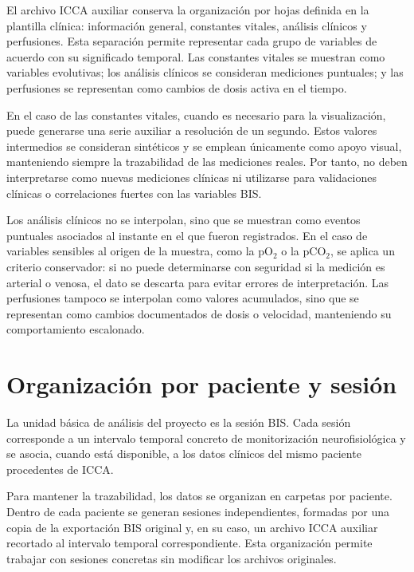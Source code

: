\documentclass[
  spanish,
  a4paper,
  12pt,
  twoside]{memoir}
\begin{document}
El archivo ICCA auxiliar conserva la organización por hojas definida en
la plantilla clínica: información general, constantes vitales, análisis
clínicos y perfusiones. Esta separación permite representar cada grupo
de variables de acuerdo con su significado temporal. Las constantes
vitales se muestran como variables evolutivas; los análisis clínicos se
consideran mediciones puntuales; y las perfusiones se representan como
cambios de dosis activa en el tiempo.

En el caso de las constantes vitales, cuando es necesario para la
visualización, puede generarse una serie auxiliar a resolución de un
segundo. Estos valores intermedios se consideran sintéticos y se emplean
únicamente como apoyo visual, manteniendo siempre la trazabilidad de las
mediciones reales. Por tanto, no deben interpretarse como nuevas
mediciones clínicas ni utilizarse para validaciones clínicas o
correlaciones fuertes con las variables BIS.

Los análisis clínicos no se interpolan, sino que se muestran como
eventos puntuales asociados al instante en el que fueron registrados. En
el caso de variables sensibles al origen de la muestra, como la pO\(_2\)
o la pCO\(_2\), se aplica un criterio conservador: si no puede
determinarse con seguridad si la medición es arterial o venosa, el dato
se descarta para evitar errores de interpretación. Las perfusiones
tampoco se interpolan como valores acumulados, sino que se representan
como cambios documentados de dosis o velocidad, manteniendo su
comportamiento escalonado.

\section{Organización por paciente y
sesión}\label{organizaciuxf3n-por-paciente-y-sesiuxf3n}

La unidad básica de análisis del proyecto es la sesión BIS. Cada sesión
corresponde a un intervalo temporal concreto de monitorización
neurofisiológica y se asocia, cuando está disponible, a los datos
clínicos del mismo paciente procedentes de ICCA.

Para mantener la trazabilidad, los datos se organizan en carpetas por
paciente. Dentro de cada paciente se generan sesiones independientes,
formadas por una copia de la exportación BIS original y, en su caso, un
archivo ICCA auxiliar recortado al intervalo temporal correspondiente.
Esta organización permite trabajar con sesiones concretas sin modificar
los archivos originales.
\end{document}
